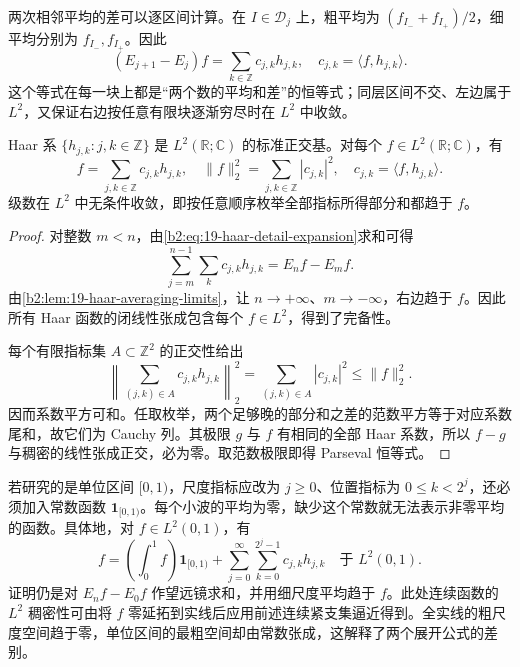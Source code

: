 两次相邻平均的差可以逐区间计算。在 \(I\in\mathcal D_j\) 上，粗平均为 \((f_{I_-}+f_{I_+})/2\)，细平均分别为 \(f_{I_-},f_{I_+}\)。因此
\begin{equation}\label{b2:eq:19-haar-detail-expansion}
 (E_{j+1}-E_j)f
 =\sum_{k\in\mathbb Z}c_{j,k}h_{j,k},
 \quad c_{j,k}=\langle f,h_{j,k}\rangle.
\end{equation}
这个等式在每一块上都是“两个数的平均和差”的恒等式；同层区间不交、左边属于 \(L^2\)，又保证右边按任意有限块逐渐穷尽时在 \(L^2\) 中收敛。

\begin{theorem}[Haar 展开]\label{b2:thm:19-haar-basis}
Haar 系 \(\{h_{j,k}:j,k\in\mathbb Z\}\) 是
\(L^2(\mathbb R;\mathbb C)\) 的标准正交基。对每个 \(f\in L^2(\mathbb R;\mathbb C)\)，有
\begin{equation}\label{b2:eq:19-haar-parseval}
 f=\sum_{j,k\in\mathbb Z}c_{j,k}h_{j,k},
 \quad \|f\|_2^2=\sum_{j,k\in\mathbb Z}|c_{j,k}|^2,
 \quad c_{j,k}=\langle f,h_{j,k}\rangle.
\end{equation}
级数在 \(L^2\) 中无条件收敛，即按任意顺序枚举全部指标所得部分和都趋于 \(f\)。
\end{theorem}
\begin{proof}
对整数 \(m<n\)，由\eqref{b2:eq:19-haar-detail-expansion}求和可得
\[
 \sum_{j=m}^{n-1}\sum_kc_{j,k}h_{j,k}=E_nf-E_mf.
\]
由\cref{b2:lem:19-haar-averaging-limits}，让 \(n\to+\infty\)、\(m\to-\infty\)，右边趋于 \(f\)。因此所有 Haar 函数的闭线性张成包含每个 \(f\in L^2\)，得到了完备性。

每个有限指标集 \(A\subset\mathbb Z^2\) 的正交性给出
\[
 \left\|\sum_{(j,k)\in A}c_{j,k}h_{j,k}\right\|_2^2
 =\sum_{(j,k)\in A}|c_{j,k}|^2\leq\|f\|_2^2.
\]
因而系数平方可和。任取枚举，两个足够晚的部分和之差的范数平方等于对应系数尾和，故它们为 Cauchy 列。其极限 \(g\) 与 \(f\) 有相同的全部 Haar 系数，所以 \(f-g\) 与稠密的线性张成正交，必为零。取范数极限即得 Parseval 恒等式。
\end{proof}

若研究的是单位区间 \([0,1)\)，尺度指标应改为 \(j\geq0\)、位置指标为 \(0\leq k<2^j\)，还必须加入常数函数 \(\mathbf1_{[0,1)}\)。每个小波的平均为零，缺少这个常数就无法表示非零平均的函数。具体地，对 \(f\in L^2(0,1)\)，有
\begin{equation}\label{b2:eq:19-haar-unit-interval}
 f=\left(\int_0^1f\right)\mathbf1_{[0,1)}
   +\sum_{j=0}^\infty\sum_{k=0}^{2^j-1}c_{j,k}h_{j,k}
 \quad\text{于 }L^2(0,1).
\end{equation}
证明仍是对 \(E_nf-E_0f\) 作望远镜求和，并用细尺度平均趋于 \(f\)。此处连续函数的 \(L^2\) 稠密性可由将 \(f\) 零延拓到实线后应用前述连续紧支集逼近得到。全实线的粗尺度空间趋于零，单位区间的最粗空间却由常数张成，这解释了两个展开公式的差别。

